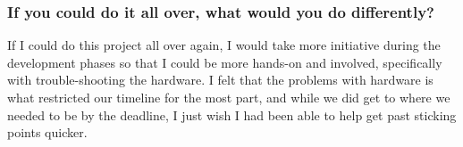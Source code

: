 \subsubsection{If you could do it all over, what would you do differently?}
If I could do this project all over again, I would take more initiative during the development phases so that I could be more hands-on and involved, specifically with trouble-shooting the hardware.
I felt that the problems with hardware is what restricted our timeline for the most part, and while we did get to where we needed to be by the deadline, I just wish I had been able to help get past sticking points quicker.
 